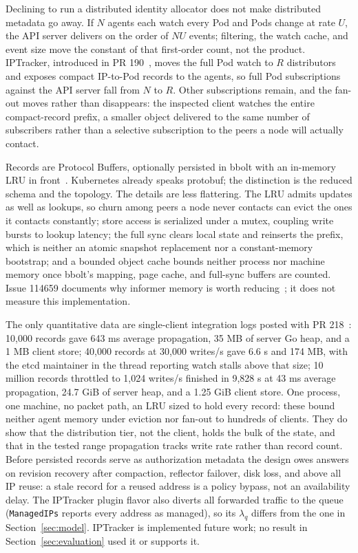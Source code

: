 Declining to run a distributed identity allocator does not make
distributed metadata go away. If $N$ agents each watch every Pod and
Pods change at rate $U$, the API server delivers on the order of $NU$
events; filtering, the watch cache, and event size move the constant of
that first-order count, not the product. IPTracker, introduced in PR
190~\cite{iptracker190}, moves the full Pod watch to $R$ distributors
and exposes compact IP-to-Pod records to the agents, so full Pod
subscriptions against the API server fall from $N$ to $R$. Other
subscriptions remain, and the fan-out moves rather than disappears: the
inspected client watches the entire compact-record prefix, a smaller
object delivered to the same number of subscribers rather than a
selective subscription to the peers a node will actually contact.

Records are Protocol Buffers, optionally persisted in bbolt with an
in-memory LRU in front~\cite{iptrackerbolt}. Kubernetes already speaks
protobuf; the distinction is the reduced schema and the topology. The
details are less flattering. The LRU admits updates as well as lookups,
so churn among peers a node never contacts can evict the ones it
contacts constantly; store access is serialized under a mutex, coupling
write bursts to lookup latency; the full sync clears local state and
reinserts the prefix, which is neither an atomic snapshot replacement
nor a constant-memory bootstrap; and a bounded object cache bounds
neither process nor machine memory once bbolt's mapping, page cache,
and full-sync buffers are counted. Issue 114659 documents why informer
memory is worth reducing~\cite{k8s114659}; it does not measure this
implementation.

The only quantitative data are single-client integration logs posted
with PR 218~\cite{iptracker218}: 10,000 records gave 643 ms average
propagation, 35 MB of server Go heap, and a 1 MB client store; 40,000
records at 30,000 writes/s gave 6.6 s and 174 MB, with the etcd
maintainer in the thread reporting watch stalls above that size; 10
million records throttled to 1,024 writes/s finished in 9,828 s at
43 ms average propagation, 24.7 GiB of server heap, and a 1.25 GiB
client store. One process, one machine, no packet path, an LRU sized to
hold every record: these bound neither agent memory under eviction nor
fan-out to hundreds of clients. They do show that the distribution
tier, not the client, holds the bulk of the state, and that in the
tested range propagation tracks write rate rather than record count.
Before persisted records serve as authorization metadata the design
owes answers on revision recovery after compaction, reflector failover,
disk loss, and above all IP reuse: a stale record for a reused address
is a policy bypass, not an availability delay. The IPTracker plugin
flavor also diverts all forwarded traffic to the queue
(\texttt{ManagedIPs} reports every address as managed), so its
$\lambda_q$ differs from the one in Section~\ref{sec:model}. IPTracker
is implemented future work; no result in Section~\ref{sec:evaluation}
used it or supports it.

